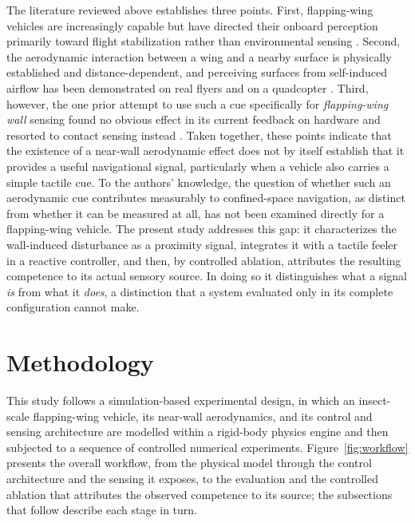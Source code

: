 \documentclass[final,5p,times]{elsarticle}
\begin{document}
The literature reviewed above establishes three points. First, flapping-wing vehicles are increasingly capable but have directed their onboard perception primarily toward flight stabilization rather than environmental sensing \cite{phan2017design, karasek2018tailless}. Second, the aerodynamic interaction between a wing and a nearby surface is physically established and distance-dependent, and perceiving surfaces from self-induced airflow has been demonstrated on real flyers and on a quadcopter \cite{nakata2020aerodynamic, lu2016ground}. Third, however, the one prior attempt to use such a cue specifically for \emph{flapping-wing wall} sensing found no obvious effect in its current feedback on hardware and resorted to contact sensing instead \cite{tu2019acting}. Taken together, these points indicate that the existence of a near-wall aerodynamic effect does not by itself establish that it provides a useful navigational signal, particularly when a vehicle also carries a simple tactile cue. To the authors' knowledge, the question of whether such an aerodynamic cue contributes measurably to confined-space navigation, as distinct from whether it can be measured at all, has not been examined directly for a flapping-wing vehicle. The present study addresses this gap: it characterizes the wall-induced disturbance as a proximity signal, integrates it with a tactile feeler in a reactive controller, and then, by controlled ablation, attributes the resulting competence to its actual sensory source. In doing so it distinguishes what a signal \emph{is} from what it \emph{does}, a distinction that a system evaluated only in its complete configuration cannot make.

\section{Methodology}
\label{sec:methodology}

This study follows a simulation-based experimental design, in which an insect-scale flapping-wing vehicle, its near-wall aerodynamics, and its control and sensing architecture are modelled within a rigid-body physics engine and then subjected to a sequence of controlled numerical experiments. Figure~\ref{fig:workflow} presents the overall workflow, from the physical model through the control architecture and the sensing it exposes, to the evaluation and the controlled ablation that attributes the observed competence to its source; the subsections that follow describe each stage in turn.
\end{document}
